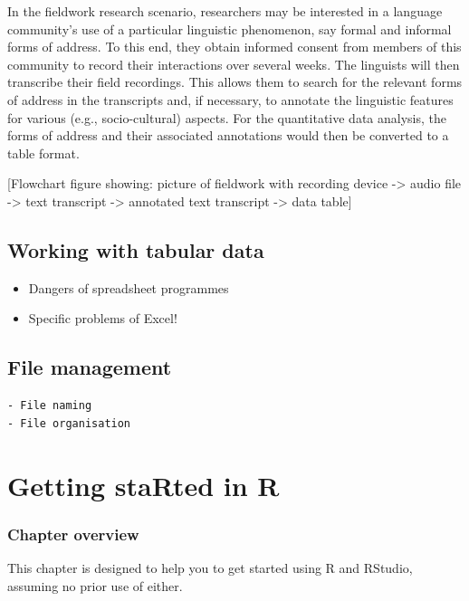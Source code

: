 \documentclass[
  letterpaper,
  DIV=11,
  numbers=noendperiod]{scrreprt}
\providecommand{\tightlist}{%
  \setlength{\itemsep}{0pt}\setlength{\parskip}{0pt}}\usepackage{longtable,booktabs,array}
\begin{document}
In the fieldwork research scenario, researchers may be interested in a
language community's use of a particular linguistic phenomenon, say
formal and informal forms of address. To this end, they obtain informed
consent from members of this community to record their interactions over
several weeks. The linguists will then transcribe their field
recordings. This allows them to search for the relevant forms of address
in the transcripts and, if necessary, to annotate the linguistic
features for various (e.g., socio-cultural) aspects. For the
quantitative data analysis, the forms of address and their associated
annotations would then be converted to a table format.

{[}Flowchart figure showing: picture of fieldwork with recording device
-\textgreater{} audio file -\textgreater{} text transcript
-\textgreater{} annotated text transcript -\textgreater{} data table{]}

\section{Working with tabular data}\label{working-with-tabular-data}

\begin{itemize}
\tightlist
\item
  Dangers of spreadsheet programmes
\item
  Specific problems of Excel!
\end{itemize}

\section{File management}\label{file-management}

\begin{verbatim}
- File naming
- File organisation
\end{verbatim}


\chapter{Getting staRted in R}\label{getting-started-in-r}

\subsection{Chapter overview}\label{chapter-overview}

This chapter is designed to help you to get started using R and RStudio,
assuming no prior use of either.
\end{document}
